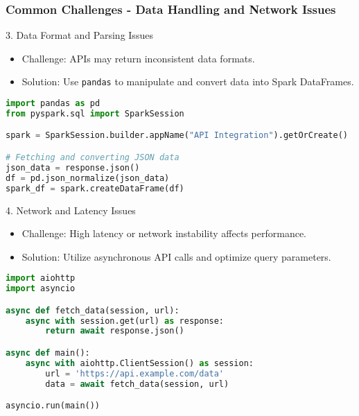 \documentclass[aspectratio=169]{beamer}
\begin{document}
\begin{frame}[fragile]
    \frametitle{Common Challenges - Data Handling and Network Issues}
    \begin{block}{3. Data Format and Parsing Issues}
        \begin{itemize}
            \item Challenge: APIs may return inconsistent data formats.
            \item Solution: Use \texttt{pandas} to manipulate and convert data into Spark DataFrames.
        \end{itemize}
        \begin{lstlisting}[language=Python]
import pandas as pd
from pyspark.sql import SparkSession

spark = SparkSession.builder.appName("API Integration").getOrCreate()

# Fetching and converting JSON data
json_data = response.json()
df = pd.json_normalize(json_data)
spark_df = spark.createDataFrame(df)
        \end{lstlisting}
    \end{block}

    \begin{block}{4. Network and Latency Issues}
        \begin{itemize}
            \item Challenge: High latency or network instability affects performance.
            \item Solution: Utilize asynchronous API calls and optimize query parameters.
        \end{itemize}
        \begin{lstlisting}[language=Python]
import aiohttp
import asyncio

async def fetch_data(session, url):
    async with session.get(url) as response:
        return await response.json()

async def main():
    async with aiohttp.ClientSession() as session:
        url = 'https://api.example.com/data'
        data = await fetch_data(session, url)

asyncio.run(main())
        \end{lstlisting}
    \end{block}
\end{frame}
\end{document}

